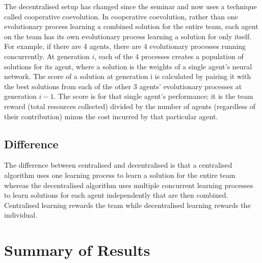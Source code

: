 \documentclass[12pt]{article}
\begin{document}
The decentralised setup has changed since the seminar and now uses a technique called cooperative coevolution. 
In cooperative coevolution, rather than one evolutionary process learning a combined solution for the entire team, each agent on the team has its own evolutionary process learning a solution for only itself. 
For example, if there are 4 agents, there are 4 evolutionary processes running concurrently. 
At generation $i$, each of the 4 processes creates a population of solutions for its agent, where a solution is the weights of a single agent’s neural network. 
The score of a solution at generation i is calculated by pairing it with the best solutions from each of the other 3 agents’ evolutionary processes at generation $i-1$. 
The score is for that single agent’s performance; it is the team reward (total resources collected) divided by the number of agents (regardless of their contribution) minus the cost incurred by that particular agent.\\

\subsection{Difference}

The difference between centralised and decentralised is that a centralised algorithm uses one learning process to learn a solution for the entire team whereas the decentralised algorithm uses multiple concurrent learning processes to learn solutions for each agent independently that are then combined. 
Centralised learning rewards the team while decentralised learning rewards the individual.\\

\section{Summary of Results}
\end{document}
